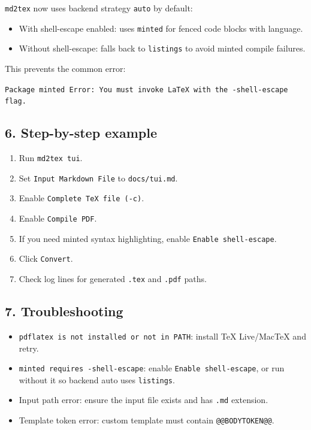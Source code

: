 \documentclass[a4paper, 12pt, twoside]{article}
\begin{document}
\texttt{md2tex} now uses backend strategy \texttt{auto} by default:

\begin{itemize}
    \item With shell-escape enabled: uses \texttt{minted} for fenced code blocks with language.
    \item Without shell-escape: falls back to \texttt{listings} to avoid minted compile failures.
\end{itemize}

This prevents the common error:

\texttt{Package minted Error: You must invoke LaTeX with the -shell-escape flag.}

\subsection*{6. Step-by-step example}

\begin{enumerate}
    \item Run \texttt{md2tex tui}.
    \item Set \texttt{Input Markdown File} to \texttt{docs/tui.md}.
    \item Enable \texttt{Complete TeX file (-c)}.
    \item Enable \texttt{Compile PDF}.
    \item If you need minted syntax highlighting, enable \texttt{Enable shell-escape}.
    \item Click \texttt{Convert}.
    \item Check log lines for generated \texttt{.tex} and \texttt{.pdf} paths.
\end{enumerate}

\subsection*{7. Troubleshooting}

\begin{itemize}
    \item \texttt{pdflatex is not installed or not in PATH}:   install TeX Live/MacTeX and retry.
    \item \texttt{minted requires -shell-escape}:   enable \texttt{Enable shell-escape}, or run without it so backend auto uses \texttt{listings}.
    \item Input path error:   ensure the input file exists and has \texttt{.md} extension.
    \item Template token error:   custom template must contain \texttt{@@BODYTOKEN@@}.
\end{itemize}
\end{document}
